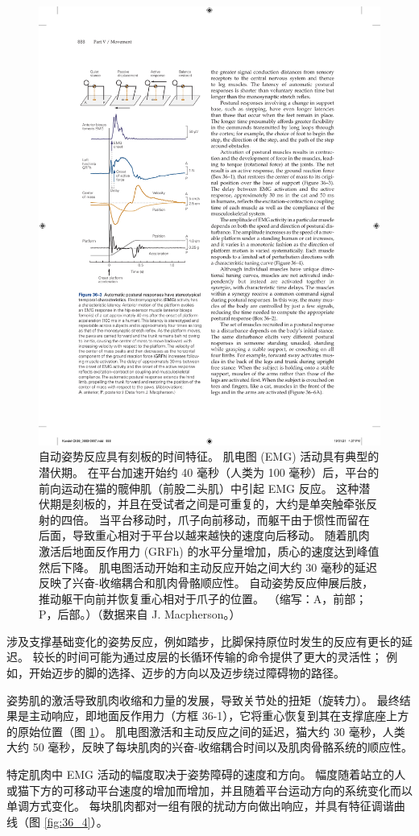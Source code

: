 \begin{figure}[htbp]
	\centering
	\includegraphics[width=0.5\linewidth]{chap36/fig_36_3}
	\caption{自动姿势反应具有刻板的时间特征。 肌电图 (EMG) 活动具有典型的潜伏期。 在平台加速开始约 40 毫秒（人类为 100 毫秒）后，平台的前向运动在猫的髋伸肌（前股二头肌）中引起 EMG 反应。 这种潜伏期是刻板的，并且在受试者之间是可重复的，大约是单突触牵张反射的四倍。 当平台移动时，爪子向前移动，而躯干由于惯性而留在后面，导致重心相对于平台以越来越快的速度向后移动。 随着肌肉激活后地面反作用力 (GRFh) 的水平分量增加，质心的速度达到峰值然后下降。 肌电图活动开始和主动反应开始之间大约 30 毫秒的延迟反映了兴奋-收缩耦合和肌肉骨骼顺应性。 自动姿势反应伸展后肢，推动躯干向前并恢复重心相对于爪子的位置。 （缩写：A，前部；P，后部。）（数据来自 J. Macpherson。）}
	\label{fig:36_3}
\end{figure}

涉及支撑基础变化的姿势反应，例如踏步，比脚保持原位时发生的反应有更长的延迟。
较长的时间可能为通过皮层的长循环传输的命令提供了更大的灵活性；
例如，开始迈步的脚的选择、迈步的方向以及迈步绕过障碍物的路径。


姿势肌的激活导致肌肉收缩和力量的发展，导致关节处的扭矩（旋转力）。
最终结果是主动响应，即地面反作用力（方框 36-1），它将重心恢复到其在支撑底座上方的原始位置（图 \ref{fig:36_3}）。
肌电图激活和主动反应之间的延迟，猫大约 30 毫秒，人类大约 50 毫秒，反映了每块肌肉的兴奋-收缩耦合时间以及肌肉骨骼系统的顺应性。


特定肌肉中 EMG 活动的幅度取决于姿势障碍的速度和方向。
幅度随着站立的人或猫下方的可移动平台速度的增加而增加，并且随着平台运动方向的系统变化而以单调方式变化。
每块肌肉都对一组有限的扰动方向做出响应，并具有特征调谐曲线（图 \ref{fig:36_4}）。


